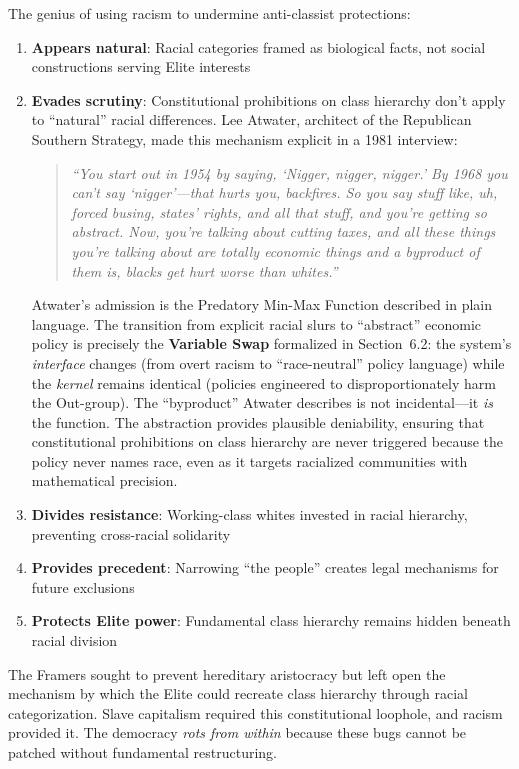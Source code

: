 \documentclass[12pt,openany]{book}
\begin{document}
The genius of using racism to undermine anti-classist protections:
\begin{enumerate}
    \item \textbf{Appears natural}: Racial categories framed as biological facts, not social constructions serving Elite interests
    \item \textbf{Evades scrutiny}: Constitutional prohibitions on class hierarchy don't apply to ``natural'' racial differences. Lee Atwater, architect of the Republican Southern Strategy, made this mechanism explicit in a 1981 interview:

    \begin{quote}
    \textit{``You start out in 1954 by saying, `Nigger, nigger, nigger.' By 1968 you can't say `nigger'---that hurts you, backfires. So you say stuff like, uh, forced busing, states' rights, and all that stuff, and you're getting so abstract. Now, you're talking about cutting taxes, and all these things you're talking about are totally economic things and a byproduct of them is, blacks get hurt worse than whites.''} \cite{atwater}
    \end{quote}

    Atwater's admission is the Predatory Min-Max Function described in plain language. The transition from explicit racial slurs to ``abstract'' economic policy is precisely the \textbf{Variable Swap} formalized in Section~6.2: the system's \textit{interface} changes (from overt racism to ``race-neutral'' policy language) while the \textit{kernel} remains identical (policies engineered to disproportionately harm the Out-group). The ``byproduct'' Atwater describes is not incidental---it \textit{is} the function. The abstraction provides plausible deniability, ensuring that constitutional prohibitions on class hierarchy are never triggered because the policy never names race, even as it targets racialized communities with mathematical precision.
    \item \textbf{Divides resistance}: Working-class whites invested in racial hierarchy, preventing cross-racial solidarity
    \item \textbf{Provides precedent}: Narrowing ``the people'' creates legal mechanisms for future exclusions
    \item \textbf{Protects Elite power}: Fundamental class hierarchy remains hidden beneath racial division
\end{enumerate}

The Framers sought to prevent hereditary aristocracy but left open the mechanism by which the Elite could recreate class hierarchy through racial categorization. Slave capitalism required this constitutional loophole, and racism provided it. The democracy \textit{rots from within} because these bugs cannot be patched without fundamental restructuring.
\end{document}
